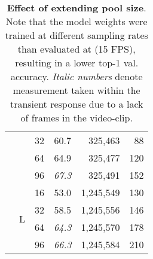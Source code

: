 \begin{table}[b!]
\begin{center}
\begin{tabular}{lllcrr}
		                &               & 32            & 60.7          & 325,463 %
		                                                                                    & 88                 \\
		                &               & 64            & 64.9          & 325,477 %
		                                                                                    & 120                \\
		                &               & 96            &\textit{67.3 } & 325,491 %
		                                                                                    & 152                \\
		                \cline{2-6}
		    &\multirow{4}{*}{L}         & 16            & 53.0          & 1,245,549 %
		                                                                                    & 130                \\
		                &               & 32            & 58.5          & 1,245,556 %
		                                                                                    & 146                \\
		                &               & 64            &\textit{64.3}  & 1,245,570 %
		                                                                                    & 178                \\
		                &               & 96            &\textit{66.3}  & 1,245,584 %
		                                                                                    & 210                \\

		\bottomrule
	\end{tabular}
	\end{center}
	\caption{\textbf{Effect of extending pool size}. %
	Note that the model weights were trained at different sampling rates than evaluated at (15 FPS), resulting in a lower top-1 val. accuracy.
	\textit{Italic numbers} denote measurement taken within the transient response due to a lack of frames in the video-clip.
	}
	\label{tab:extended_window_size}
\end{table}

